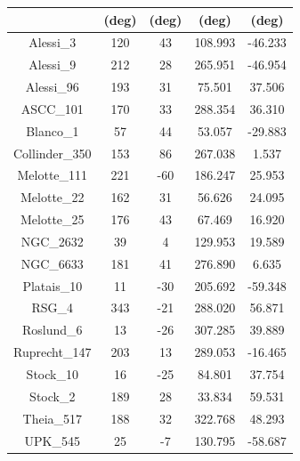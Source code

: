 \documentclass{aa}
\begin{document}
\begin{appendix}
\begin{table}[h]
\begin{tabular}{c c c c c}
         & (\rm{deg}) & (\rm{deg}) & (\rm{deg}) & (\rm{deg}) \\
\hline
Alessi\_3            & 120           & 43            & 108.993         & -46.233         \\
Alessi\_9            & 212           & 28            & 265.951         & -46.954         \\
Alessi\_96           & 193           & 31            & 75.501          & 37.506          \\
ASCC\_101            & 170           & 33            & 288.354         & 36.310          \\
Blanco\_1            & 57            & 44            & 53.057          & -29.883         \\
Collinder\_350       & 153           & 86            & 267.038         & 1.537           \\
Melotte\_111         & 221           & -60           & 186.247         & 25.953          \\
Melotte\_22          & 162           & 31            & 56.626          & 24.095          \\
Melotte\_25          & 176           & 43            & 67.469          & 16.920          \\
NGC\_2632            & 39            & 4             & 129.953         & 19.589          \\
NGC\_6633            & 181           & 41            & 276.890         & 6.635           \\
Platais\_10          & 11            & -30           & 205.692         & -59.348         \\
RSG\_4               & 343           & -21           & 288.020         & 56.871          \\
Roslund\_6           & 13            & -26           & 307.285         & 39.889          \\
Ruprecht\_147        & 203           & 13            & 289.053         & -16.465         \\
Stock\_10            & 16            & -25           & 84.801          & 37.754          \\
Stock\_2             & 189           & 28            & 33.834          & 59.531          \\
Theia\_517           & 188           & 32            & 322.768         & 48.293          \\
UPK\_545             & 25            & -7            & 130.795         & -58.687         \\
\hline
\end{tabular}


\end{table}
\end{appendix}
\end{document}
